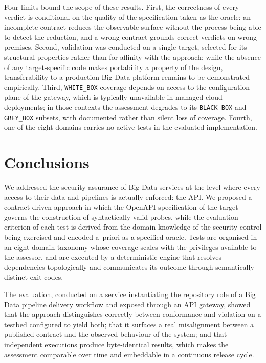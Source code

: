 \documentclass[
]{ceurart}
\begin{document}
Four limits bound the scope of these results.
First, the correctness of every verdict is conditional on the quality of the specification taken as the oracle: an incomplete contract reduces the observable surface without the process being able to detect the reduction, and a wrong contract grounds correct verdicts on wrong premises.
Second, validation was conducted on a single target, selected for its structural properties rather than for affinity with the approach; while the absence of any target-specific code makes portability a property of the design, transferability to a production Big Data platform remains to be demonstrated empirically.
Third, \texttt{WHITE\_BOX} coverage depends on access to the configuration plane of the gateway, which is typically unavailable in managed cloud deployments; in those contexts the assessment degrades to its \texttt{BLACK\_BOX} and \texttt{GREY\_BOX} subsets, with documented rather than silent loss of coverage.
Fourth, one of the eight domains carries no active tests in the evaluated implementation.


\section{Conclusions}

We addressed the security assurance of Big Data services at the level where every access to their data and pipelines is actually enforced: the API.
We proposed a contract-driven approach in which the OpenAPI specification of the target governs the construction of syntactically valid probes, while the evaluation criterion of each test is derived from the domain knowledge of the security control being exercised and encoded a~priori as a specified oracle.
Tests are organised in an eight-domain taxonomy whose coverage scales with the privileges available to the assessor, and are executed by a deterministic engine that resolves dependencies topologically and communicates its outcome through semantically distinct exit codes.

The evaluation, conducted on a service instantiating the repository role of a Big Data pipeline delivery workflow and exposed through an API gateway, showed that the approach distinguishes correctly between conformance and violation on a testbed configured to yield both; that it surfaces a real misalignment between a published contract and the observed behaviour of the system; and that independent executions produce byte-identical results, which makes the assessment comparable over time and embeddable in a continuous release cycle.
\end{document}
